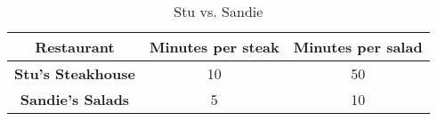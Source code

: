 \begin{table}[h]
  \centering
  \begin{tabular}{|c|c|c|}
    \hline
    \textbf{Restaurant} & \textbf{Minutes per steak} & \textbf{Minutes per salad} \\
    \hline
    \textbf{Stu's Steakhouse} & 10 & 50 \\
    \hline
    \textbf{Sandie's Salads} & 5 & 10 \\
    \hline
  \end{tabular}
  \caption{Stu vs. Sandie}
\end{table}